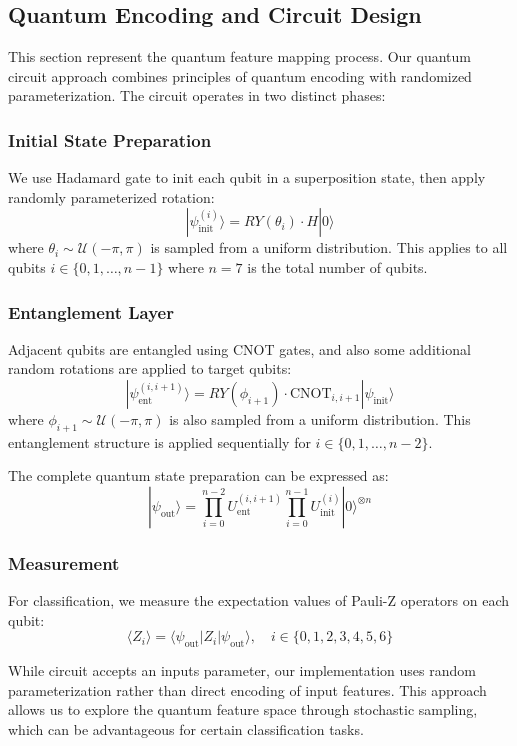 \documentclass[conference]{IEEEtran}
\begin{document}
\subsection{Quantum Encoding and Circuit Design}
This section represent the quantum feature mapping process. Our quantum circuit approach combines principles of quantum encoding with randomized parameterization. The circuit operates in two distinct phases:

\subsubsection{Initial State Preparation}
We use Hadamard gate to init each qubit in a superposition state, then apply randomly parameterized rotation:
\[
    |\psi_{\text{init}}^{(i)}\rangle = RY(\theta_i) \cdot H |0\rangle
\]
where $\theta_i \sim \mathcal{U}(-\pi, \pi)$ is sampled from a uniform distribution. This applies to all qubits $i \in \{0, 1, \ldots, n-1\}$ where $n=7$ is the total number of qubits.

\subsubsection{Entanglement Layer}
Adjacent qubits are entangled using CNOT gates, and also some additional random rotations are applied to target qubits:
\[
    |\psi_{\text{ent}}^{(i,i+1)}\rangle = RY(\phi_{i+1}) \cdot \text{CNOT}_{i,i+1} |\psi_{\text{init}}\rangle
\]
where $\phi_{i+1} \sim \mathcal{U}(-\pi, \pi)$ is also sampled from a uniform distribution. This entanglement structure is applied sequentially for $i \in \{0, 1, \ldots, n-2\}$.

The complete quantum state preparation can be expressed as:
\[
    |\psi_{\text{out}}\rangle = \prod_{i=0}^{n-2} U_{\text{ent}}^{(i,i+1)} \prod_{i=0}^{n-1} U_{\text{init}}^{(i)} |0\rangle^{\otimes n}
\]

\subsubsection{Measurement}
For classification, we measure the expectation values of Pauli-Z operators on each qubit:
\[
    \langle Z_i \rangle = \langle\psi_{\text{out}}|Z_i|\psi_{\text{out}}\rangle, \quad i \in \{0,1,2,3,4,5,6\}
\]

While circuit accepts an inputs parameter, our implementation uses random parameterization rather than direct encoding of input features. This approach allows us to explore the quantum feature space through stochastic sampling, which can be advantageous for certain classification tasks.
\end{document}
